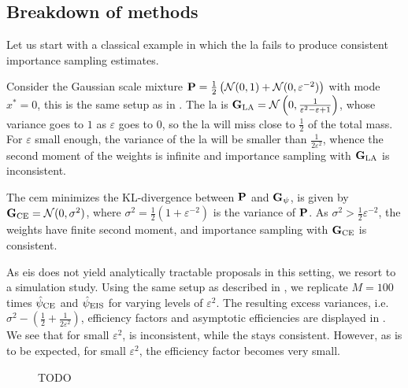 \subsection{Breakdown of methods}

Let us start with a classical example in which the \gls{la} fails to produce consistent importance sampling estimates. 
\begin{example}
  \label{ex:la_failure}
  Consider the Gaussian scale mixture $\P = \frac{1}{2} \left(\mathcal N (0,1) + \mathcal N(0, \varepsilon^{-2})\right)$ with mode $x^{\ast}=0$, this is the same setup as in . 
  The \gls{la} is $\G_{\text{LA}} = \mathcal N \left( 0, \frac{1}{\varepsilon^{2} - \varepsilon + 1} \right)$, whose variance goes to $1$ as $\varepsilon$ goes to $0$, so the \gls{la} will miss close to $\frac 1 2$ of the total mass.
  For $\varepsilon$ small enough, the variance of the \gls{la} will be smaller than $\frac{1}{2\varepsilon^{2}}$, whence the second moment of the weights is infinite and importance sampling with $\G_{\text{LA}}$ is inconsistent.

  The \gls{cem} minimizes the KL-divergence between $\P$ and $\G_{\psi}$, is given by $\G_{\text{CE}} = \mathcal N (0, \sigma^{2})$, where $\sigma^{2} = \frac{1}{2}\left( 1 + \varepsilon^{-2} \right)$ is the variance of $\P$.
  As $\sigma^{2} > \frac{1}{2}\varepsilon^{-2}$, the weights have finite second moment, and importance sampling with $\G_{\ce}$ is consistent.

  As \Gls{eis} does not yield analytically tractable proposals in this setting, we resort to a simulation study. Using the same setup as described in , we replicate $M = 100$ times $\hpce$ and $\hpeis$ for varying levels of $\varepsilon^{2}$. The resulting excess variances, i.e. $\sigma^{2} - \left( \frac{1}{2} + \frac{1}{2 \varepsilon^{2}} \right)$, efficiency factors and asymptotic efficiencies are displayed in . We see that for small $\varepsilon^{2}$, \aeis is inconsistent, while the \acem stays consistent. However, as is to be expected, for small $\varepsilon^{2}$, the efficiency factor becomes very small.
    \begin{figure}
        \centering

        \resizebox{\textwidth}{!}{%
        }
        \caption{{\color{red} TODO}}
        \label{fig:gsmm_eps}
    \end{figure}

\end{example}

